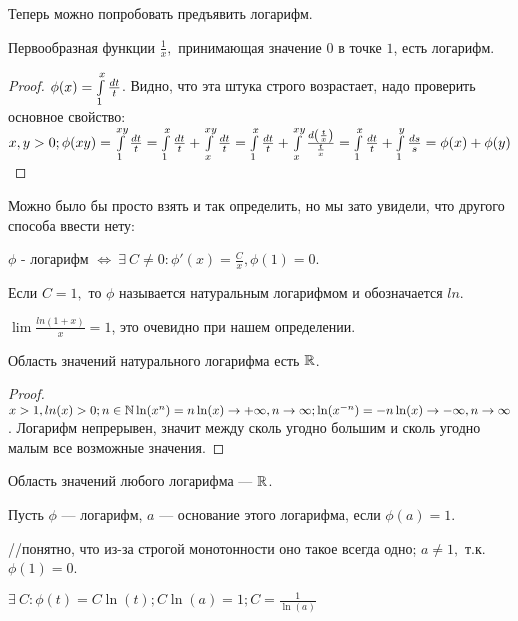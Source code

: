 \documentclass[12pt]{report}
\begin{document}
Теперь можно попробовать предъявить логарифм.

\begin{thm}
Первообразная функции $\frac{1}{x},$ принимающая значение $0$ в точке $1$, есть логарифм.
\end{thm}
\begin{proof}
$\phi(x) = \int\limits_1^x{\frac{dt}{t}}$. Видно, что эта штука строго возрастает, надо проверить основное свойство:
$x, y > 0; \phi(xy) = \int\limits_1^{xy}{\frac{dt}{t}} = \int\limits_1^x{\frac{dt}{t}} + \int\limits_x^{xy}{\frac{dt}{t}} = \int\limits_1^x{\frac{dt}{t}} + \int\limits_x^{xy}{\frac{d\left(\frac{t}{x}\right)}{\frac{t}{x}}} = \int\limits_1^x{\frac{dt}{t}} + \int\limits_1^y{\frac{ds}{s}} = \phi(x) + \phi(y)$
\end{proof}

\begin{rem}
Можно было бы просто взять и так определить, но мы зато увидели, что другого способа ввести нету:
\end{rem}

\begin{thm}
$\phi$ - логарифм $\Leftrightarrow ~\exists ~ C \neq 0: \phi'(x) = \frac{C}{x}, \phi(1) = 0$.
\end{thm}

\begin{name}
Если $C = 1,$ то $\phi$ называется натуральным логарифмом и обозначается $ln$.
\end{name}

\begin{note}
$\lim{\frac{ln(1 + x)}{x}} = 1$, это очевидно при нашем определении.
\end{note}

\begin{st}
Область значений натурального логарифма есть $\mathbb{R}$.
\end{st}
\begin{proof}
$x > 1, ln(x) > 0; n \in \mathbb{N} \ln(x^n) = n\ln(x) \to +\infty, n \to \infty; \ln(x^{-n}) = -n\ln(x) \to -\infty, n \to \infty$.  Логарифм непрерывен, значит между сколь угодно большим и сколь угодно малым все возможные значения.
\end{proof}

\begin{cor}
Область значений любого логарифма --- $\mathbb{R}$.
\end{cor}

\begin{defn}
Пусть $\phi$ --- логарифм, $a$ --- основание этого логарифма, если $\phi(a) = 1$. 

//понятно, что из-за строгой монотонности оно такое всегда одно; $a \neq 1,$ т.к. $\phi(1) = 0$.

$\exists ~C: \phi(t) = C\ln(t); C\ln(a) = 1; C = \frac{1}{\ln(a)}$
\end{defn}
\end{document}
